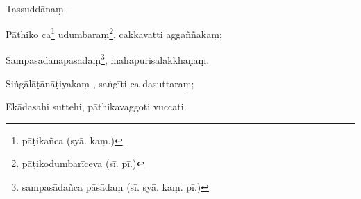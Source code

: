 \paragraph{}
Tassuddānaṃ –

Pāthiko ca\footnote{pāṭikañca (syā. kaṃ.)} udumbaraṃ\footnote{pāṭikodumbarīceva (sī. pī.)}, cakkavatti aggaññakaṃ;

Sampasādanapāsādaṃ\footnote{sampasādañca pāsādaṃ (sī. syā. kaṃ. pī.)}, mahāpurisalakkhaṇaṃ.

Siṅgālāṭānāṭiyakaṃ , saṅgīti ca dasuttaraṃ;

Ekādasahi suttehi, pāthikavaggoti vuccati.

